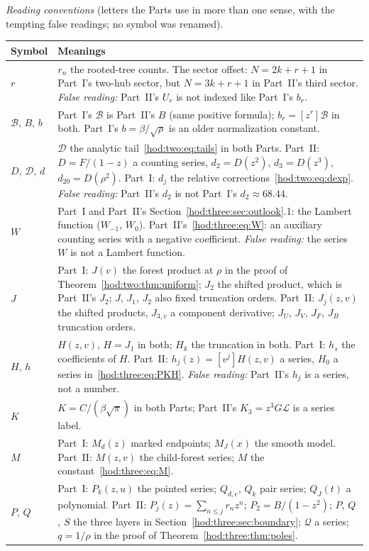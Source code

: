 \documentclass[11pt,letterpaper]{article}
\theoremstyle{definition}\newtheorem{definition}[theorem]{Definition}
\theoremstyle{remark}\newtheorem{remark}[theorem]{Remark}
\newcommand{\Bcal}{\mathcal B}
\newcommand{\Dcal}{\mathcal D}
\newcommand{\Lcal}{\mathcal L}
\newcommand{\Qcal}{\mathcal Q}
\begin{document}
\medskip
\begingroup\small
\noindent\emph{Reading conventions} (letters the Parts use in more than one
sense, with the tempting false readings; no symbol was renamed).\par\smallskip
\renewcommand{\arraystretch}{1.1}
\begin{longtable}{@{}>{\raggedright\arraybackslash}p{0.75in}>{\raggedright\arraybackslash}p{5.45in}@{}}
\toprule
Symbol & Meanings\\
\midrule
\endhead
$r$ & $r_n$ the rooted-tree counts. The sector offset: $N=2k+r+1$ in Part~I's two-hub sector, but $N=3k+r+1$ in Part~II's third sector. \emph{False reading:} Part~II's $U_r$ is not indexed like Part~I's $b_r$.\\
$\Bcal$, $B$, $b$ & Part~I's $\Bcal$ is Part~II's $B$ (same positive formula); $b_r=[z^r]\Bcal$ in both. Part~I's $b=\beta/\sqrt\rho$ is an older normalization constant.\\
$D$, $\Dcal$, $d$ & $\Dcal$ the analytic tail~\eqref{hod:two:eq:tails} in both Parts. Part~II: $D=F/(1-z)$ a counting series, $d_2=D(z^2)$, $d_3=D(z^3)$, $d_{20}=D(\rho^2)$. Part~I: $d_j$ the relative corrections~\eqref{hod:two:eq:dexp}. \emph{False reading:} Part~II's $d_2$ is not Part~I's $d_2\approx68.44$.\\
$W$ & Part~I and Part~II's Section~\ref{hod:three:sec:outlook}.1: the Lambert function ($W_{-1}$, $W_0$). Part~II's~\eqref{hod:three:eq:W}: an auxiliary counting series with a negative coefficient. \emph{False reading:} the series $W$ is not a Lambert function.\\
$J$ & Part~I: $J(v)$ the forest product at $\rho$ in the proof of Theorem~\ref{hod:two:thm:uniform}; $J_2$ the shifted product, which is Part~II's $J_2$; $J$, $J_1$, $J_2$ also fixed truncation orders. Part~II: $J_j(z,v)$ the shifted products, $J_{3,v}$ a component derivative; $J_U$, $J_V$, $J_F$, $J_B$ truncation orders.\\
$H$, $h$ & $H(z,v)$, $H=J_1$ in both; $H_k$ the truncation in both. Part~I: $h_s$ the coefficients of $H$. Part~II: $h_j(z)=[v^j]H(z,v)$ a series, $H_0$ a series in~\eqref{hod:three:eq:PKH}. \emph{False reading:} Part~II's $h_j$ is a series, not a number.\\
$K$ & $K=C/(\beta\sqrt\pi)$ in both Parts; Part~II's $K_3=z^3G\Lcal$ is a series label.\\
$M$ & Part~I: $M_d(z)$ marked endpoints; $M_J(x)$ the smooth model. Part~II: $M(z,v)$ the child-forest series; $M$ the constant~\eqref{hod:three:eq:M}.\\
$P$, $Q$ & Part~I: $P_k(z,u)$ the pointed series; $Q_{d,e}$, $Q_k$ pair series; $Q_J(t)$ a polynomial. Part~II: $P_j(z)=\sum_{n\le j}r_nz^n$; $P_2=B/(1-z^2)$; $P$, $Q$, $S$ the three layers in Section~\ref{hod:three:sec:boundary}; $\Qcal$ a series; $q=1/\rho$ in the proof of Theorem~\ref{hod:three:thm:poles}.\\

\end{longtable}
\end{document}
